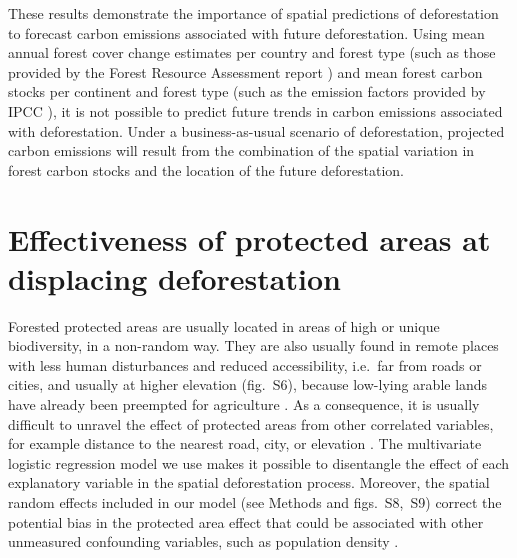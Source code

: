\documentclass[
  12pt,
]{article}
\begin{document}
These results demonstrate the importance of spatial predictions of deforestation to forecast carbon emissions associated with future deforestation. Using mean annual forest cover change estimates per country and forest type (such as those provided by the Forest Resource Assessment report \citep{FAO2015}) and mean forest carbon stocks per continent and forest type (such as the emission factors provided by IPCC \citep{IPCC2019}), it is not possible to predict future trends in carbon emissions associated with deforestation. Under a business-as-usual scenario of deforestation, projected carbon emissions will result from the combination of the spatial variation in forest carbon stocks and the location of the future deforestation.

\hypertarget{effectiveness-of-protected-areas-at-displacing-deforestation}{%
\section{Effectiveness of protected areas at displacing deforestation}\label{effectiveness-of-protected-areas-at-displacing-deforestation}}

Forested protected areas are usually located in areas of high or unique biodiversity, in a non-random way. They are also usually found in remote places with less human disturbances and reduced accessibility, i.e.~far from roads or cities, and usually at higher elevation (fig.~S6), because low-lying arable lands have already been preempted for agriculture \citep{Geist2002}. As a consequence, it is usually difficult to unravel the effect of protected areas from other correlated variables, for example distance to the nearest road, city, or elevation \citep{Andam2008}. The multivariate logistic regression model we use makes it possible to disentangle the effect of each explanatory variable in the spatial deforestation process. Moreover, the spatial random effects included in our model (see Methods and figs.~S8,~S9) correct the potential bias in the protected area effect that could be associated with other unmeasured confounding variables, such as population density \citep{Andam2008}.\\
\end{document}
